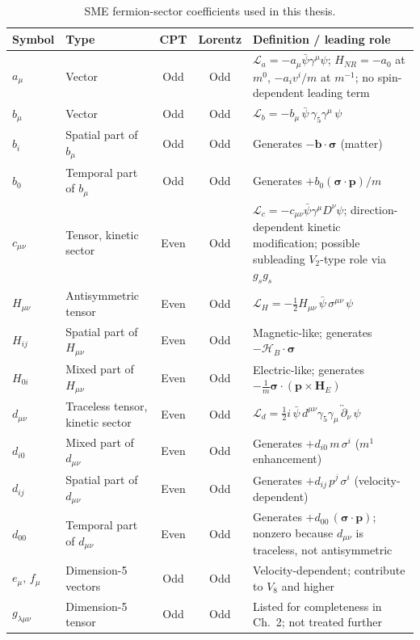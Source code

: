 \documentclass[main]{subfiles}
\begin{document}
\begin{table}[h]
\centering
\small
\begin{tabular}{@{}llcc>{\raggedright\arraybackslash}p{5.5cm}@{}}
\toprule
Symbol & Type & CPT & Lorentz & Definition / leading role \\
\midrule
$a_\mu$ & Vector & Odd & Odd & $\mathcal L_a=-a_\mu\bar\psi\gamma^\mu\psi$; $H_{NR}=-a_0$ at $m^0$, $-a_iv^i/m$ at $m^{-1}$; no spin-dependent leading term \\
$b_\mu$ & Vector & Odd & Odd & $\mathcal L_b=-b_\mu\,\bar\psi\,\gamma_5\gamma^\mu\,\psi$ \\
$b_i$ & Spatial part of $b_\mu$ & Odd & Odd & Generates $-\mathbf b\cdot\boldsymbol\sigma$ (matter) \\
$b_0$ & Temporal part of $b_\mu$ & Odd & Odd & Generates $+b_0(\boldsymbol\sigma\cdot\mathbf p)/m$ \\
$c_{\mu\nu}$ & Tensor, kinetic sector & Even & Odd & $\mathcal L_c=-c_{\mu\nu}\bar\psi\gamma^\mu D^\nu\psi$; direction-dependent kinetic modification; possible subleading $V_2$-type role via $g_sg_s$ \\
$H_{\mu\nu}$ & Antisymmetric tensor & Even & Odd & $\mathcal L_H=-\tfrac12 H_{\mu\nu}\,\bar\psi\,\sigma^{\mu\nu}\,\psi$ \\
$H_{ij}$ & Spatial part of $H_{\mu\nu}$ & Even & Odd & Magnetic-like; generates $-\boldsymbol{\mathcal H}_B\cdot\boldsymbol\sigma$ \\
$H_{0i}$ & Mixed part of $H_{\mu\nu}$ & Even & Odd & Electric-like; generates $-\tfrac1m\boldsymbol\sigma\cdot(\mathbf p\times\mathbf H_E)$ \\
$d_{\mu\nu}$ & Traceless tensor, kinetic sector & Even & Odd & $\mathcal L_d=\tfrac12 i\,\bar\psi\,d^{\mu\nu}\gamma_5\gamma_\mu\,\overleftrightarrow\partial_\nu\,\psi$ \\
$d_{i0}$ & Mixed part of $d_{\mu\nu}$ & Even & Odd & Generates $+d_{i0}\,m\,\sigma^i$ ($m^1$ enhancement) \\
$d_{ij}$ & Spatial part of $d_{\mu\nu}$ & Even & Odd & Generates $+d_{ij}\,p^j\,\sigma^i$ (velocity-dependent) \\
$d_{00}$ & Temporal part of $d_{\mu\nu}$ & Even & Odd & Generates $+d_{00}\,(\boldsymbol\sigma\cdot\mathbf p)$; nonzero because $d_{\mu\nu}$ is traceless, not antisymmetric \\
$e_\mu,\,f_\mu$ & Dimension-5 vectors & Odd & Odd & Velocity-dependent; contribute to $V_8$ and higher \\
$g_{\lambda\mu\nu}$ & Dimension-5 tensor & Odd & Odd & Listed for completeness in Ch.~2; not treated further \\
\bottomrule
\end{tabular}
\caption{SME fermion-sector coefficients used in this thesis.}
\label{tab:app-sme}
\end{table}
\end{document}
